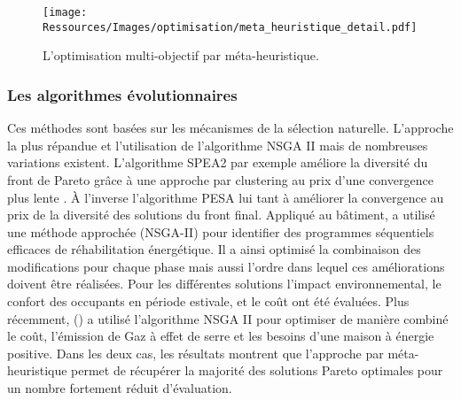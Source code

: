 \begin{figure}
    \begin{center}
        \texttt{[image: Ressources/Images/optimisation/meta\_heuristique\_detail.pdf]}
    \end{center}
    \caption{L’optimisation multi-objectif par méta-heuristique.
             \label{fig:multi_meta_detail}}
\end{figure}

\subsubsection{Les algorithmes évolutionnaires} %
\label{ssub:les_algorithmes_evolutionnaires}
Ces méthodes sont basées sur les mécanismes de la sélection naturelle. L’approche la plus
répandue et l’utilisation de l’algorithme NSGA II \parencite{Deb2002182} mais de nombreuses
variations existent. L’algorithme SPEA2 par exemple améliore la diversité du front de Pareto
grâce à une approche par clustering au prix d’une convergence plus lente \parencite{Zitzler2001}.
À l’inverse l’algorithme PESA lui tant à améliorer la convergence au prix de la diversité des
solutions du front final. Appliqué au bâtiment, \cite{Rivallain2013}
a utilisé une méthode approchée (NSGA-II) pour identifier des programmes séquentiels
efficaces de réhabilitation énergétique. Il a ainsi optimisé la combinaison des
modifications pour chaque phase mais aussi l’ordre dans lequel ces améliorations
doivent être réalisées. Pour les différentes solutions l’impact environnemental,
le confort des occupants en période estivale, et le coût ont été évaluées.
Plus récemment, () a utilisé l’algorithme NSGA II pour
optimiser de manière combiné le coût, l’émission de Gaz à effet de serre et
les besoins d’une maison à énergie positive.
Dans les deux cas, les résultats montrent que l’approche par méta-heuristique permet
de récupérer la majorité des solutions Pareto optimales pour un nombre
fortement réduit d’évaluation.


